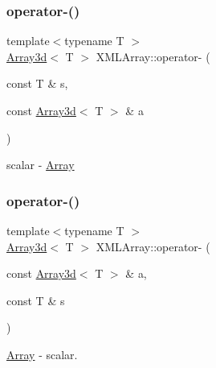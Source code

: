 \subsubsection{\texorpdfstring{operator-\/()}{operator-()}\hspace{0.1cm}{\footnotesize\ttfamily [3/8]}}
{\footnotesize\ttfamily template$<$typename T $>$ \\
\mbox{\hyperlink{classXMLArray_1_1Array3d}{Array3d}}$<$ T $>$ X\+M\+L\+Array\+::operator-\/ (\begin{DoxyParamCaption}\item[{const T \&}]{s,  }\item[{const \mbox{\hyperlink{classXMLArray_1_1Array3d}{Array3d}}$<$ T $>$ \&}]{a }\end{DoxyParamCaption})\hspace{0.3cm}{\ttfamily [inline]}}



scalar -\/ \mbox{\hyperlink{classXMLArray_1_1Array}{Array}} 

\mbox{\label{namespaceXMLArray_a87b6f705aa4d225a13f5d6857be44459}} 
\subsubsection{\texorpdfstring{operator-\/()}{operator-()}\hspace{0.1cm}{\footnotesize\ttfamily [4/8]}}
{\footnotesize\ttfamily template$<$typename T $>$ \\
\mbox{\hyperlink{classXMLArray_1_1Array3d}{Array3d}}$<$ T $>$ X\+M\+L\+Array\+::operator-\/ (\begin{DoxyParamCaption}\item[{const \mbox{\hyperlink{classXMLArray_1_1Array3d}{Array3d}}$<$ T $>$ \&}]{a,  }\item[{const T \&}]{s }\end{DoxyParamCaption})\hspace{0.3cm}{\ttfamily [inline]}}



\mbox{\hyperlink{classXMLArray_1_1Array}{Array}} -\/ scalar. 

\mbox{\label{namespaceXMLArray_a1d51bbb3ee59a78dd9e705ecd3db1571}} 
